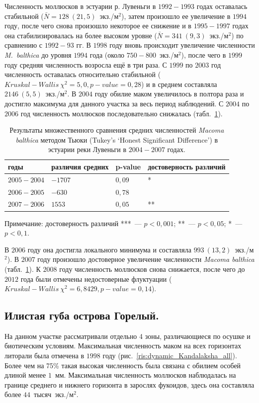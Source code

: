 Численность моллюсков в эстуарии р. Лувеньги в $1992-1993$ годах оставалась стабильной ($\bar{N} = 128~(21,5)$~экз./м$^2$), затем произошло ее увеличение в $1994$ году, после чего снова произошло некоторое ее снижение и в $1995 - 1997$ годах она стабилизировалась на более высоком уровне ($\bar{N} = 341~(9,3)$~экз./м$^2$) по сравнению с $1992 - 93$ гг.
В $1998$ году вновь происходит увеличение численности {\it M.~balthica} до уровня $1994$ года (около $750 - 800$~экз./м$^2$), после чего в $1999$ году средняя численность возросла ещё в три раза.
С $1999$ по $2003$ год численность оставалась относительно стабильной  ($Kruskal-Wallis\ \chi^2 = 5,0, p-value = 0,28$) и в среднем составляла $2146~(5,5)$~экз./м$^2$.
В $2004$ году обилие маком увеличилось в полтора раза и достигло максимума для данного участка за весь период наблюдений. 
С $2004$ по $2006$ год численность моллюсков последовательно снижалась (табл.~\ref {tab:Tukey_estuary_04_07_n2}). 
	\begin{table}[p]
	\begin{tabularx}{\textwidth}{|*{4}{X|}} \hline
	годы & различия средних & p-value & достоверность различий\\
	\hline
	$2005-2004$ & $-1707$ & $0,09$ & *\\
	\hline
	$2006-2005$ & $-630$ & $0,78$ & \\
	\hline
	$2007-2006$ & $1553$ & $0,05$ & **\\
	\hline
	\end{tabularx}

	{\footnotesize Примечание: достоверность различий ***~--- $p<0,001$; **~--- $p<0,05$; *~--- $p<0,1$.}
	\caption{Результаты множественного сравнения средних численностей {\it Macoma balthica} методом Тьюки (Tukey's ‘Honest Significant Difference’) в эстуарии реки Лувеньги в $2004-2007$ годах.}
	\label{tab:Tukey_estuary_04_07_n2}
	\end{table}
В $2006$ году она достигла локального минимума и составляла $993~(13,2)$~экз./м$^2$). 
В $2007$ году произошло достоверное увеличение численности {\it Macoma balthica} (табл.~\ref {tab:Tukey_estuary_04_07_n2}).
К $2008$ году численность моллюсков снова снижается, после чего до $2012$ года были отмечены недостоверные флуктуации ($Kruskal-Wallis\ \chi^2 = 6,8429, p-value = 0,14$).

		\subsection{Илистая губа острова Горелый.}
На данном участке рассматривали отдельно 4 зоны, различающиеся по осушке и биотическим условиям. 
Максимальная численность маком на всех горизонтах литорали была отмечена в $1998$ году (рис.~\ref{ris:dynamic_Kandalaksha_all}).
Более чем на 75\% такая высокая численность была связана с обилием особей длиной менее $1$~мм.
Максимальная численность моллюсков наблюдалась на границе среднего и нижнего горизонта в зарослях фукоидов, здесь она составляла более $44$~тысяч~экз./м$^2$.

